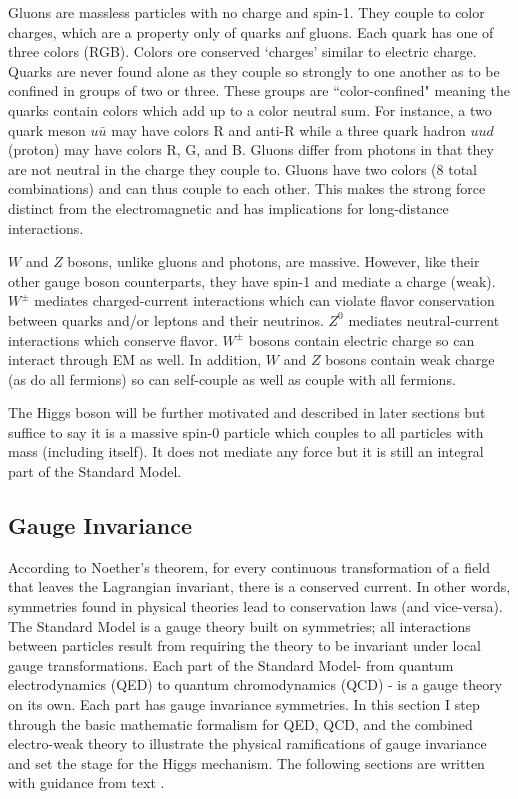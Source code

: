 Gluons are massless particles with no charge and spin-1. They couple to color charges, which are a property only of quarks anf gluons. Each quark has one of three colors (RGB). Colors ore conserved `charges' similar to electric charge. Quarks are never found alone as they couple so strongly to one another as to be confined in groups of two or three. These groups are ``color-confined" meaning the quarks contain colors which add up to a color neutral sum. For instance, a two quark meson $u\bar{u}$ may have colors R and anti-R while a three quark hadron $uud$ (proton) may have colors R, G, and B. Gluons differ from photons in that they are not neutral in the charge they couple to. Gluons have two colors (8 total combinations) and can thus couple to each other. This makes the strong force distinct from the electromagnetic and has implications for long-distance interactions.
 
$W$ and $Z$ bosons, unlike gluons and photons, are massive. However, like their other gauge boson counterparts, they have spin-1 and mediate a charge (weak). $W^{\pm}$ mediates charged-current interactions which can violate flavor conservation between quarks and/or leptons and their neutrinos. $Z^{0}$ mediates neutral-current interactions which conserve flavor. $W^{\pm}$ bosons contain electric charge so can interact through EM as well. In addition, $W$ and $Z$ bosons contain weak charge (as do all fermions) so can self-couple as well as couple with all fermions. 
 
The Higgs boson will be further motivated and described in later sections but suffice to say it is a massive spin-0 particle which couples to all particles with mass (including itself). It does not mediate any force but it is still an integral part of the Standard Model.  

\subsection{Gauge Invariance}
According to Noether's theorem, for every continuous transformation of a field that leaves the Lagrangian invariant, there is a conserved current. In other words, symmetries found in physical theories lead to conservation laws (and vice-versa). The Standard Model is a gauge theory built on symmetries; all interactions between particles result from requiring the theory to be invariant under local gauge transformations. Each part of the Standard Model- from quantum electrodynamics (QED) to quantum chromodynamics (QCD) - is a gauge theory on its own. Each part has gauge invariance symmetries. In this section I step through the basic mathematic formalism for QED, QCD, and the combined electro-weak theory to illustrate the physical ramifications of gauge invariance and set the stage for the Higgs mechanism. The following sections are written with guidance from text \cite{HalzenMartin}. 

